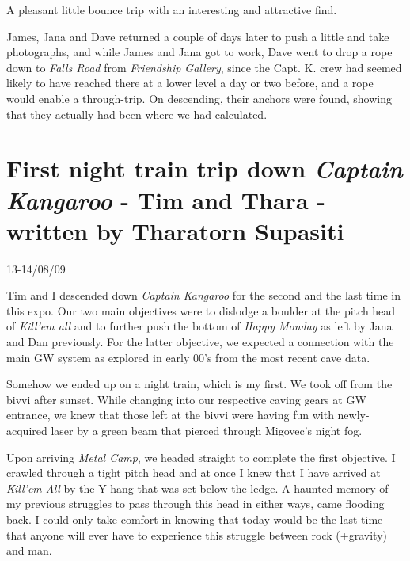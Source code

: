 A pleasant little bounce trip with an interesting and attractive find.

James, Jana and Dave returned a couple of days later to push a little
and take photographs, and while James and Jana got to work, Dave went to
drop a rope down to \emph{Falls Road} from \emph{Friendship Gallery},
since the Capt. K. crew had seemed likely to have reached there at a
lower level a day or two before, and a rope would enable a through-trip.
On descending, their anchors were found, showing that they actually had
been where we had calculated.


\hypertarget{first-night-train-trip-down-captain-kangaroo---tim-and-thara---written-by-tharatorn-supasiti}{%
\section{\texorpdfstring{First night train trip down \emph{Captain
Kangaroo} - Tim and Thara - written by Tharatorn
Supasiti}{First night train trip down Captain Kangaroo - Tim and Thara - written by Tharatorn Supasiti}}\label{first-night-train-trip-down-captain-kangaroo---tim-and-thara---written-by-tharatorn-supasiti}}

13-14/08/09

Tim and I descended down \emph{Captain Kangaroo} for the second and the
last time in this expo. Our two main objectives were to dislodge a
boulder at the pitch head of \emph{Kill'em all} and to further push the
bottom of \emph{Happy Monday} as left by Jana and Dan previously. For
the latter objective, we expected a connection with the main GW system
as explored in early 00's from the most recent cave data.

Somehow we ended up on a night train, which is my first. We took off
from the bivvi after sunset. While changing into our respective caving
gears at GW entrance, we knew that those left at the bivvi were having
fun with newly-acquired laser by a green beam that pierced through
Migovec's night fog.

Upon arriving \emph{Metal Camp}, we headed straight to complete the
first objective. I crawled through a tight pitch head and at once I knew
that I have arrived at \emph{Kill'em All} by the Y-hang that was set
below the ledge. A haunted memory of my previous struggles to pass
through this head in either ways, came flooding back. I could only take
comfort in knowing that today would be the last time that anyone will
ever have to experience this struggle between rock (+gravity) and man.

